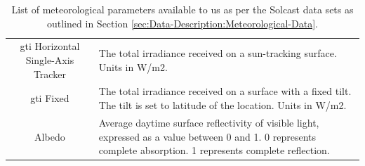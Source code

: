 \begin{table}[H]
\begin{adjustwidth*}{-3.0cm}{-3.0cm}
\begin{tabularx}{\linewidth}{cX}
                        \gls{gti} Horizontal Single-Axis Tracker & The total irradiance received on a sun-tracking surface.  Units in W/m2.                                                                                                                                                                                  \\
                        \gls{gti} Fixed                          & The total irradiance received on a surface with a fixed tilt. The tilt is set to latitude of the location.  Units in W/m2.                                                                                                                                \\
                        Albedo                                   & Average daytime surface reflectivity of visible light, expressed as a value between 0 and 1. 0 represents complete absorption. 1 represents complete reflection.                                                                                          \\ \bottomrule
                \end{tabularx}
                \caption{List of meteorological parameters available to us as per the Solcast data sets as outlined in Section \ref{sec:Data-Description:Meteorological-Data}.}
                \label{tab:Solcast-parameters}
        \end{adjustwidth*}
\end{table}

